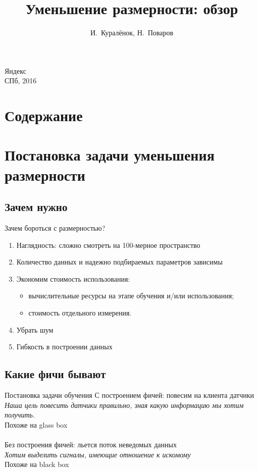 \documentclass[14pt, fleqn, xcolor={dvipsnames, table}]{beamer}
\title{Уменьшение размерности: обзор\\\small{}}
\author[]{\small{%
И.~Куралёнок,
Н.~Поваров}}
\date{}
\begin{document}
\begin{frame}
\maketitle
\small
\begin{center}
\vspace{-60pt}
\normalsize {\color{red}Я}ндекс \\
\vspace{80pt}
\footnotesize СПб, 2016
\end{center}
\end{frame}

\section{Содержание}
\section{Постановка задачи уменьшения размерности}
\subsection{Зачем нужно}
\begin{frame}{Зачем бороться с размерностью?}
\begin{enumerate}
  \item Наглядность: сложно смотреть на 100-мерное пространство
  \item Количество данных и надежно подбираемых параметров зависимы
  \item Экономим стоимость использования:
  \begin{itemize}
    \item вычислительные ресурсы на этапе обучения и/или использования;
    \item стоимость отдельного измерения.
  \end{itemize}
  \item Убрать шум
  \item Гибкость в построении данных
\end{enumerate}
\end{frame}

\subsection{Какие фичи бывают}
\begin{frame}{Постановка задачи обучения}{}
{\color{blue}С построением фичей}: повесим на клиента датчики \\
\textit{Наша цель повесить датчики правильно, зная какую информацию мы хотим получить.}\\
Похоже на glass box\\
~\\
{\color{blue}Без построения фичей}: льется поток неведомых данных \\
\textit{Хотим выделить сигналы, имеющие отношение к искомому} \\
Похоже на black box
\end{frame}
\end{document}
